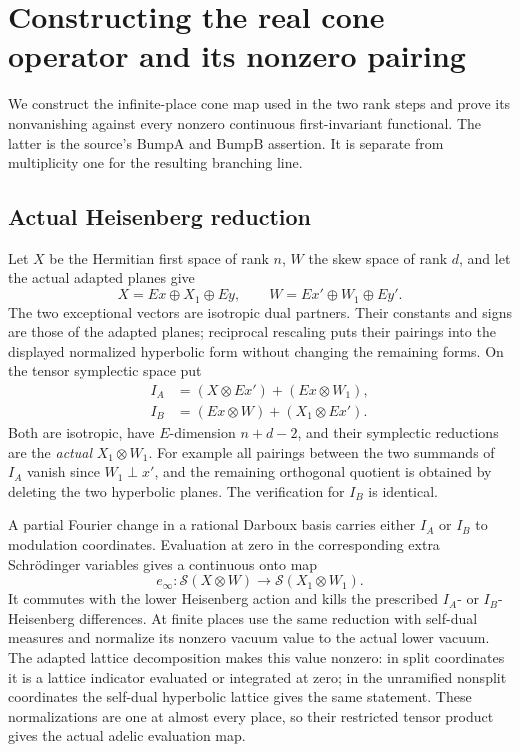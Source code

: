 \section{Constructing the real cone operator and its nonzero pairing}
\label{sec:sr-real-cone-operator}

We construct the infinite-place cone map used in the two
rank steps and prove its nonvanishing against every
nonzero continuous first-invariant functional. The latter
is the source's \(\mathrm{BumpA}\) and
\(\mathrm{BumpB}\) assertion. It is separate from
multiplicity one for the resulting branching line.

\subsection{Actual Heisenberg reduction}

Let \(X\) be the Hermitian first space of rank \(n\), \(W\)
the skew space of rank \(d\), and let the actual adapted
planes give
\[
 X=Ex\oplus X_1\oplus Ey,\qquad
 W=Ex'\oplus W_1\oplus Ey'.
\]
The two exceptional vectors are isotropic dual partners.
Their constants and signs are those of the adapted
planes; reciprocal rescaling puts their pairings into the
displayed normalized hyperbolic form without changing
the remaining forms. On the tensor symplectic space put
\[
 \begin{split}
 I_A&=(X\otimes Ex')+(Ex\otimes W_1),\\
 I_B&=(Ex\otimes W)+(X_1\otimes Ex').
 \end{split}
\]
Both are isotropic, have \(E\)-dimension \(n+d-2\), and
their symplectic reductions are the \emph{actual}
\(X_1\otimes W_1\). For example all pairings between the
two summands of \(I_A\) vanish since
\(W_1\perp x'\), and the remaining orthogonal quotient
is obtained by deleting the two hyperbolic planes.
The verification for \(I_B\) is identical.

A partial Fourier change in a rational Darboux basis
carries either \(I_A\) or \(I_B\) to modulation coordinates.
Evaluation at zero in the corresponding extra
Schr\"odinger variables gives a continuous onto map
\[
 e_\infty:\mathcal S(X\otimes W)
                        \longrightarrow\mathcal S(X_1\otimes W_1).
\]
It commutes with the lower Heisenberg action and kills
the prescribed \(I_A\)- or \(I_B\)-Heisenberg differences.
At finite places use the same reduction with self-dual
measures and normalize its nonzero vacuum value to the
actual lower vacuum. The adapted lattice decomposition
makes this value nonzero: in split coordinates it is a
lattice indicator evaluated or integrated at zero; in
the unramified nonsplit coordinates the self-dual
hyperbolic lattice gives the same statement. These
normalizations are one at almost every place, so their
restricted tensor product gives the actual adelic
evaluation map.

